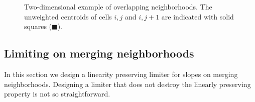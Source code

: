 \begin{figure}
	\hfill
	\caption{\sf Two-dimensional example of overlapping neighborhoods.  The unweighted centroids of cells $i,j$ and $i,j+1$ are indicated with solid squares ($\blacksquare$).} \label{fig:2nborTile}
\end{figure}


\subsection{Limiting on merging neighborhoods}
In this section we design a linearity preserving limiter for slopes on merging neighborhoods.  Designing a limiter that does not destroy the linearly preserving property is not so straightforward.  
